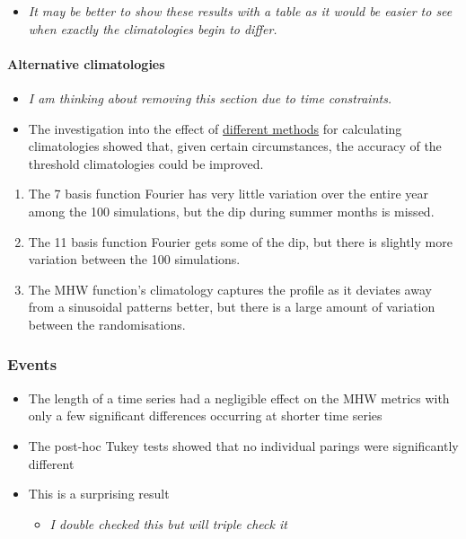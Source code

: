 \documentclass[]{article}
\providecommand{\tightlist}{%
  \setlength{\itemsep}{0pt}\setlength{\parskip}{0pt}}
\let\oldparagraph\paragraph
\renewcommand{\paragraph}[1]{\oldparagraph{#1}\mbox{}}
\begin{document}
\begin{itemize}
\tightlist
\item
  \emph{It may be better to show these results with a table as it would
  be easier to see when exactly the climatologies begin to differ.}
\end{itemize}

\paragraph{Alternative climatologies}\label{alternative-climatologies}

\begin{itemize}
\item
  \emph{I am thinking about removing this section due to time
  constraints.}
\item
  The investigation into the effect of
  \href{https://robwschlegel.github.io/MHWdetection/articles/Climatologies_and_baselines.html}{different
  methods} for calculating climatologies showed that, given certain
  circumstances, the accuracy of the threshold climatologies could be
  improved.
\end{itemize}

\begin{enumerate}
\def\labelenumi{\arabic{enumi}.}
\tightlist
\item
  The 7 basis function Fourier has very little variation over the entire
  year among the 100 simulations, but the dip during summer months is
  missed.
\item
  The 11 basis function Fourier gets some of the dip, but there is
  slightly more variation between the 100 simulations.
\item
  The MHW function's climatology captures the profile as it deviates
  away from a sinusoidal patterns better, but there is a large amount of
  variation between the randomisations.
\end{enumerate}

\subsubsection{Events}\label{events}

\begin{itemize}
\tightlist
\item
  The length of a time series had a negligible effect on the MHW metrics
  with only a few significant differences occurring at shorter time
  series
\item
  The post-hoc Tukey tests showed that no individual parings were
  significantly different
\item
  This is a surprising result

  \begin{itemize}
  \tightlist
  \item
    \emph{I double checked this but will triple check it}
  \end{itemize}
\end{itemize}
\end{document}
